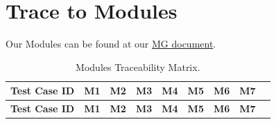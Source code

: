 \documentclass[12pt, titlepage]{article}
\begin{document}
		
\section{Trace to Modules}		

Our Modules can be found at our \href{https://github.com/PaisWillie/Digital-Composite/blob/main/docs/Design/SoftArchitecture/MG.pdf}{MG document}.

\renewcommand{\arraystretch}{1.3} %
\begin{longtable}{|p{3.5cm}|p{1cm}|p{1cm}|p{1cm}|p{1cm}|p{1cm}|p{1cm}|p{1cm}|p{1cm}}
\caption{Modules Traceability Matrix.} \label{tab:long} \\
    \hline
    \textbf{Test Case ID} & \textbf{M1} & \textbf{M2} & \textbf{M3} & \textbf{M4} & \textbf{M5} & \textbf{M6} & \textbf{M7}\\
    \hline
    \endfirsthead
    
    \hline
    \textbf{Test Case ID} & \textbf{M1} & \textbf{M2} & \textbf{M3} & \textbf{M4} & \textbf{M5} & \textbf{M6} & \textbf{M7}\\
    \hline
    \endhead


\end{longtable}
\end{document}
